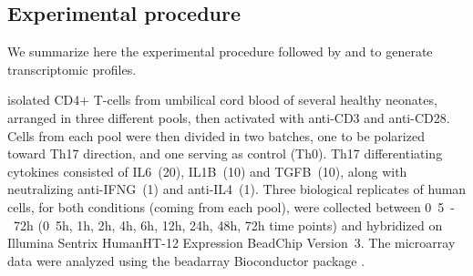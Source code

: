 	\subsection{Experimental procedure}


We summarize here the experimental procedure followed by \textcite{tuomela2012identification} and \textcite{yosef2013dynamic} to generate transcriptomic profiles.

\textcite{tuomela2012identification} isolated CD4+ T-cells from umbilical cord blood of several healthy neonates, arranged in three different pools, then activated with anti-CD3 and anti-CD28.
Cells from each pool were then divided in two batches, one to be polarized toward Th17 direction, and one serving as control (Th0).
Th17 differentiating cytokines consisted of IL6~(\unit{20}{\nano\gram\per\milli\liter}), IL1B~(\unit{10}{\nano\gram\per\milli\liter}) and TGFB~(\unit{10}{\nano\gram\per\milli\liter}), along with neutralizing anti-IFNG~(\unit{1}{\micro\gram\per\milli\liter}) and anti-IL4~(\unit{1}{\micro\gram\per\milli\liter}).
Three biological replicates of human cells, for both conditions (coming from each pool), were collected between \unit{0.5-72}{h} (\unit{0.5}{h}, \unit{1}{h}, \unit{2}{h}, \unit{4}{h}, \unit{6}{h}, \unit{12}{h}, \unit{24}{h}, \unit{48}{h}, \unit{72}{h} time points) and hybridized on Illumina Sentrix HumanHT-12 Expression BeadChip Version~3.
The microarray data were analyzed using the beadarray Bioconductor package \parencite{dunning2007beadarray}.

